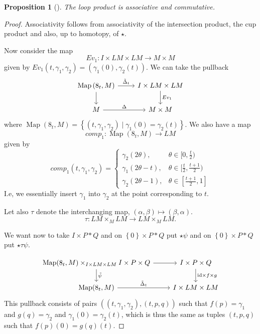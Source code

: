 \documentclass[reqno]{amsart}
\newtheorem{proposition}[theorem]{Proposition}
\theoremstyle{definition}
\theoremstyle{remark}
\DeclareMathOperator{\Map}{Map}
\newcommand{\id}{{\mathrm{id}}}
\begin{document}
\begin{proposition}[]
    The loop product is associative and commutative.
\end{proposition}

\begin{proof}
    Associativity follows from associativity
    of the intersection product, the cup product and also, up to
    homotopy, of $\star$.


    Now consider the map
    \[
    E v_1 \colon I \times LM \times LM \to M \times M
    \] 
    given by $E v_1 \left( t, \gamma_1, \gamma_2  \right) = 
    \left( \gamma_1(0), \gamma_2(t) \right) $.
    We can take the pullback 
    \begin{equation*}
    \begin{tikzcd}
        \Map \left( 8_t, M \right) 
        \ar[d] \ar[r, "\tilde{\Delta}_t"] & 
        I \times LM \times LM \ar[d, "Ev_1"] \\
        M \ar[r, "\Delta"] & M \times M
    \end{tikzcd}
    \end{equation*}
    where $\Map\left( 8_t, M \right) = 
    \left\{ \left( t, \gamma_1, \gamma_2 \right)  \mid 
    \gamma_1(0) = \gamma_2(t) \right\} $.
    We also have a map
    \[
    comp_1 \colon \Map\left( 8_t, M \right) \to LM
    \] 
    given by
    \[
    comp_1 \left( t, \gamma_1, \gamma_2 \right) =
    \begin{cases}
        \gamma_2 \left( 2 \theta \right) ,& \theta \in [0, \frac{t}{2})\\
        \gamma_1 (2 \theta- t),& \theta \in [\frac{t}{2}, \frac{t+1}{2})\\
        \gamma_2 \left( 2 \theta -1 \right) ,& \theta \in 
        [ \frac{t+1}{2},1]
    \end{cases}
    \] 
    I.e, we essentially insert $\gamma_1$ into
    $\gamma_2$ at the point corresponding to $t$.

    Let also $\tau$ denote the interchanging map,
    $\left( \alpha,\beta  \right) \mapsto \left( \beta, \alpha \right) $.
    \[
    \tau \colon LM \times_M LM \to LM \times_M LM.
    \] 

    We want now to take
    $I \times P*Q$ and
    on $\left\{ 0 \right\} \times P*Q$ put
    $\star \psi$ and on
    $\left\{ 0 \right\} \times P * Q$ put
    $\star \tau \psi$.

    \begin{equation*}
    \begin{tikzcd}
        \Map(8_t,M) \times_{I \times LM \times LM}
        I \times P \times Q \ar[r] \ar[d, "\tilde{\psi}"]
        & I \times P \times Q \ar[d, "\id \times f\times g"] \\
        \Map(8_t,M) \ar[r, "\tilde{\Delta}_t"] & 
        I \times LM \times LM
    \end{tikzcd}
    \end{equation*}
    This pullback consists of pairs
    $\left( \left( t, \gamma_1, \gamma_2 \right) ,
    \left( t,p,q \right) \right) $ such that
    $f(p) = \gamma_1$ and $g(q) = \gamma_2$ and
    $\gamma_1(0) = \gamma_2(t)$, which is thus the same
    as tuples
    $\left( t,p,q \right) $ such that
    $f(p)(0) = g(q)(t)$.


\end{proof}
\end{document}
